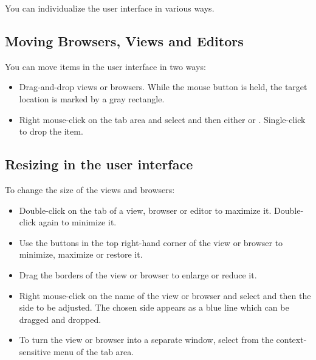 \label{adapting views}
You can individualize the \app{} user interface in various ways. 

\subsection{Moving Browsers, Views and Editors}
You can move items in the user interface  in two ways:

\begin{itemize}
\item Drag-and-drop views or browsers. While the mouse button
 is held, the target location is marked by a gray rectangle.
\item Right mouse-click on the tab area and select
 and then either  or .
Single-click to drop the item. 
\end{itemize}

\subsection{Resizing in the user interface}

To change the size of the views and browsers:
\begin{itemize}
\item Double-click on the tab of a view, browser or editor to maximize it. Double-click again to minimize it.
\item  Use the buttons in the  top right-hand corner of the view or browser to 
minimize, maximize or restore it.  
\item Drag the borders of the view or browser to enlarge or reduce it.
\item Right mouse-click on the name of the view or browser and select
 and then the side to be adjusted. The chosen side 
appears as a blue line which can be dragged and dropped. 
\item To turn the view or browser into a separate window, select 
\mbox{}
 from
the context-sensitive menu of the tab area. 
\end{itemize}  

